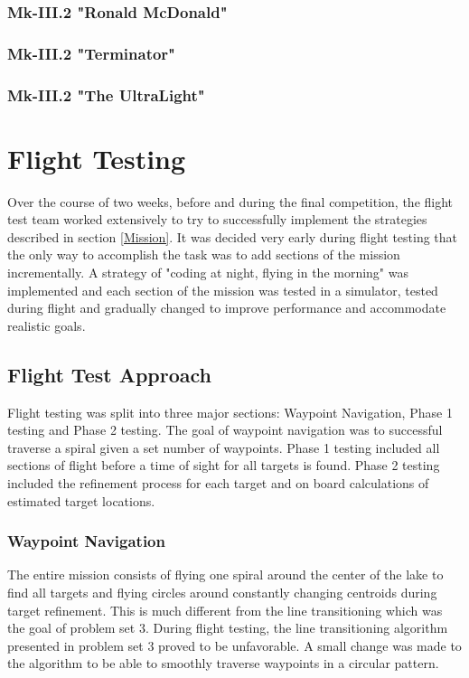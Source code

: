 \documentclass[11pt]{article}
\begin{document}
\subsubsection{Mk-III.2 "Ronald McDonald"}
\label{mk3.2}
\subsubsection{Mk-III.2 "Terminator"}
\label{mk3.3}
\subsubsection{Mk-III.2 "The UltraLight"}
\label{mk3.4}


\section{Flight Testing}
\label{FlightTesting}
Over the course of two weeks, before and during the final competition, the flight test team worked extensively to try to successfully implement the strategies described in section \ref{Mission}. It was decided very early during flight testing that the only way to accomplish the task was to add sections of the mission incrementally. A strategy of "coding at night, flying in the morning" was implemented and each section of the mission was tested in a simulator, tested during flight and gradually changed to improve performance and accommodate realistic goals.

\subsection{Flight Test Approach}
\label{FltTstAppr}
Flight testing was split into three major sections: Waypoint Navigation, Phase 1 testing and Phase 2 testing. The goal of waypoint navigation was to successful traverse a spiral given a set number of waypoints. Phase 1 testing included all sections of flight before a time of sight for all targets is found. Phase 2 testing included the refinement process for each target and on board calculations of estimated target locations.

\subsubsection{Waypoint Navigation}
The entire mission consists of flying one spiral around the center of the lake to find all targets and flying circles around constantly changing centroids during target refinement. This is much different from the line transitioning which was the goal of problem set 3. During flight testing, the line transitioning algorithm presented in problem set 3 proved to be unfavorable. A small change was made to the algorithm to be able to smoothly traverse waypoints in a circular pattern.\\
\end{document}
